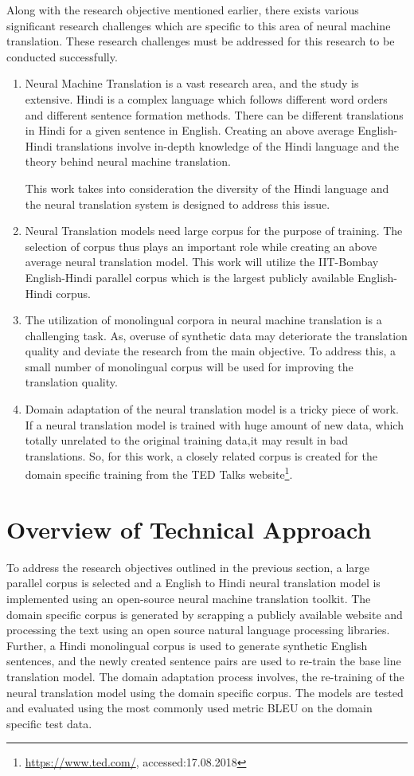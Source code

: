Along with the research objective mentioned earlier, there exists various significant research challenges which are specific to this area of neural machine translation. These research challenges must be addressed for this research to be conducted successfully. 
\begin{enumerate}
    \item Neural Machine Translation is a vast research area, and the study is extensive. Hindi is a complex language which follows different word orders and different sentence formation methods. There can be different translations in Hindi for a given sentence in English. Creating an above average English-Hindi translations involve in-depth knowledge of the Hindi language and the theory behind neural machine translation. 
    
    This work takes into consideration the diversity of the Hindi language and the neural translation system is designed to address this issue. 
    \item Neural Translation models need large corpus for the purpose of training. The selection of corpus thus plays an important role while creating an above average neural translation model. This work will utilize the IIT-Bombay English-Hindi parallel corpus which is the largest publicly available English-Hindi corpus. 
    \item The utilization of monolingual corpora in neural machine translation is a challenging task. As, overuse of synthetic data may deteriorate the translation quality and deviate the research from the main objective. To address this, a small number of monolingual corpus will be used for improving the translation quality.
    \item Domain adaptation of the neural translation model is a tricky piece of work. If a neural translation model is trained with huge amount of new data, which totally unrelated to the original training data,it may result in bad translations. So, for this work, a closely related corpus is created for the domain specific training from the TED Talks website\footnote{\url{https://www.ted.com/}, accessed:17.08.2018}. 
\end{enumerate}

\section{Overview of Technical Approach}

To address the research objectives outlined in the previous section, a large parallel corpus is selected and a English to Hindi neural translation model is implemented using an open-source neural machine translation toolkit. The domain specific corpus is generated by scrapping a publicly available website and processing the text using an open source natural language processing libraries. Further, a Hindi monolingual corpus is used to generate synthetic English sentences, and the newly created sentence pairs are used to re-train the base line translation model. The domain adaptation process involves, the re-training of the neural translation model using the domain specific corpus.  The models are tested and evaluated using the most commonly used metric BLEU on the domain specific test data. 

